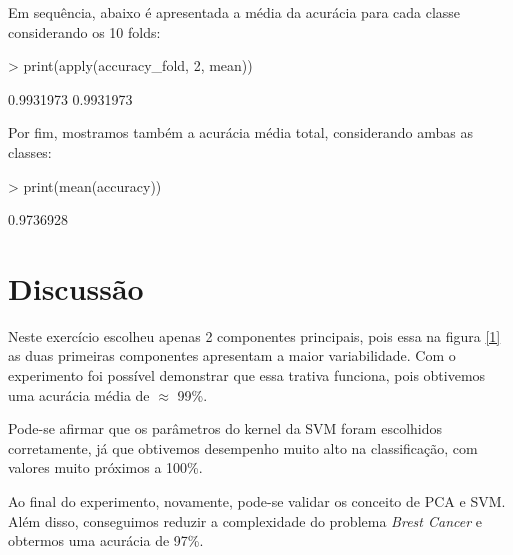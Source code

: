 \documentclass[12pt]{article}
\begin{document}
\par Em sequência, abaixo é apresentada a média da acurácia para cada classe considerando os 10 folds:

\begin{Schunk}
\begin{Sinput}
> print(apply(accuracy_fold, 2, mean))
\end{Sinput}
\begin{Soutput}
[1] 0.9931973 0.9931973
\end{Soutput}
\end{Schunk}

\par Por fim, mostramos também a acurácia média total, considerando ambas as classes:

\begin{Schunk}
\begin{Sinput}
> print(mean(accuracy))
\end{Sinput}
\begin{Soutput}
[1] 0.9736928
\end{Soutput}
\end{Schunk}


\section{Discussão}

  \par Neste exercício escolheu apenas 2 componentes principais, pois essa na figura \ref{1} as duas primeiras componentes apresentam a maior variabilidade. Com o experimento foi possível demonstrar que essa trativa funciona, pois obtivemos uma acurácia média de $\approx$ 99\%.
  
  \par Pode-se afirmar que os parâmetros do kernel da SVM foram escolhidos corretamente, já que obtivemos desempenho muito alto na classificação, com valores muito próximos a 100\%. 
  
  \par Ao final do experimento, novamente, pode-se validar os conceito de PCA e SVM. Além disso, conseguimos reduzir a complexidade do problema \textit{Brest Cancer} e obtermos uma acurácia de 97\%.


\end{document}
